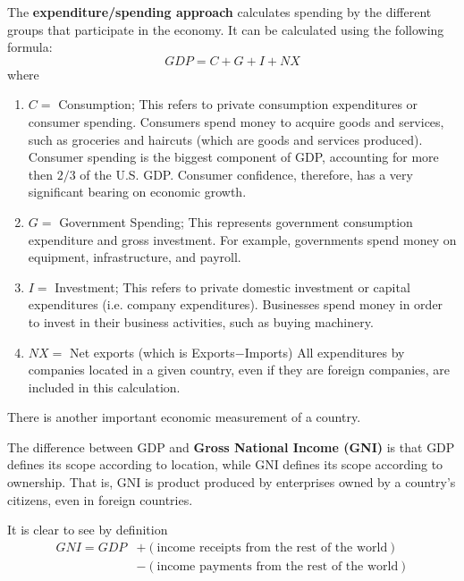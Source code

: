 \documentclass{article}
\begin{document}
  \begin{definition}
    \label{def:expenditure-approach}
    The \textbf{expenditure/spending approach} calculates spending by the different groups that participate in the economy. It can be calculated using the following formula: 
    \begin{equation}
      GDP = C + G + I + NX
    \end{equation}
    where
    \begin{enumerate}
        \item $C = $ Consumption; This refers to private consumption expenditures or consumer spending. Consumers spend money to acquire goods and services, such as groceries and haircuts (which are goods and services produced). Consumer spending is the biggest component of GDP, accounting for more then $2/3$ of the U.S. GDP. Consumer confidence, therefore, has a very significant bearing on economic growth. 
        \item $G = $ Government Spending; This represents government consumption expenditure and gross investment. For example, governments spend money on equipment, infrastructure, and payroll. 
        \item $I = $ Investment; This refers to private domestic investment or capital expenditures (i.e. company expenditures). Businesses spend money in order to invest in their business activities, such as buying machinery. 
        \item $NX = $ Net exports (which is Exports$-$Imports) All expenditures by companies located in a given country, even if they are foreign companies, are included in this calculation. 
    \end{enumerate}
  \end{definition}

  There is another important economic measurement of a country. 

  \begin{definition}
    \label{def:gross-national-income}
    The difference between GDP and \textbf{Gross National Income (GNI)} is that GDP defines its scope according to location, while GNI defines its scope according to ownership. That is, GNI is product produced by enterprises owned by a country's citizens, even in foreign countries.

    It is clear to see by definition 
    \begin{align*}
        GNI = GDP & + (\text{income receipts from the rest of the world}) \\
        & - (\text{income payments from the rest of the world})
    \end{align*}
  \end{definition}
\end{document}
